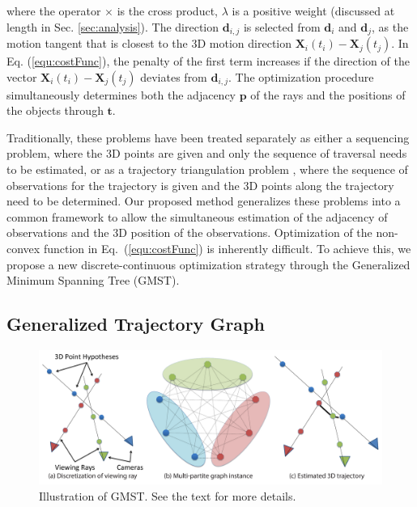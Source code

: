 where the operator $\times$ is the cross product, $\lambda$ is a positive weight (discussed at length in Sec. \ref{sec:analysis}). The direction $\mathbf{d}_{i,j}$ is selected from $\mathbf{d}_i$ and $\mathbf{d}_j$, as the motion tangent that is closest to the 3D motion direction $\mathbf{X}_i(t_i)-\mathbf{X}_j(t_j)$.
In Eq. (\ref{equ:costFunc}), the penalty of the first term increases if the direction of the vector $\mathbf{X}_i(t_i)-\mathbf{X}_j(t_j)$ deviates from $\mathbf{d}_{i,j}$.
The optimization procedure simultaneously determines both the adjacency $\mathbf{p}$ of the rays and the positions of the objects through $\mathbf{t}$.

Traditionally, these problems have been treated separately as either a sequencing problem,
where the 3D points are given and only the sequence of traversal needs to be estimated, or as a trajectory triangulation problem \cite{Park_ECCV2010,Valmadre_CVPR2012}, where the sequence of observations for the trajectory is given and the 3D points along the trajectory need to be determined. Our proposed method generalizes these problems into a common framework to allow the simultaneous estimation of the adjacency of observations and the 3D position of the observations. %
Optimization of the non-convex function in Eq.~(\ref{equ:costFunc}) is inherently difficult. To achieve this, we propose a new discrete-continuous  optimization strategy through the Generalized Minimum Spanning Tree (GMST).

\subsection{Generalized Trajectory Graph}
\begin{figure}[t]
\centering
    \includegraphics[width=1\columnwidth]{chapter4/resource/gmst_eccv.pdf}
\caption{Illustration of GMST. See the text for more details.}
\label{fig:gmst}
\end{figure}

